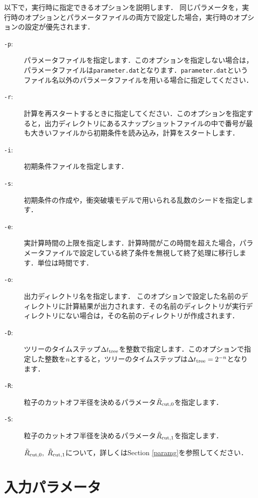 \documentclass[12pt,a4paper,dvipdfmx]{jsarticle}
\begin{document}
以下で，実行時に指定できるオプションを説明します．
同じパラメータを，実行時のオプションとパラメータファイルの両方で設定した場合，実行時のオプションの設定が優先されます．

\begin{description}
\item[\texttt{-p}:]
パラメータファイルを指定します．このオプションを指定しない場合は，パラメータファイルは\texttt{parameter.dat}となります．\texttt{parameter.dat}というファイル名以外のパラメータファイルを用いる場合に指定してください．
\item[\texttt{-r}:]
計算を再スタートするときに指定してください．このオプションを指定すると，出力ディレクトリにあるスナップショットファイルの中で番号が最も大きいファイルから初期条件を読み込み，計算をスタートします．
\item[\texttt{-i}:]
初期条件ファイルを指定します．
\item[\texttt{-s}:]
初期条件の作成や，衝突破壊モデルで用いられる乱数のシードを指定します．
\item[\texttt{-e}:]
実計算時間の上限を指定します．計算時間がこの時間を超えた場合，パラメータファイルで設定している終了条件を無視して終了処理に移行します．単位は時間です．
\item[\texttt{-o}:]
出力ディレクトリ名を指定します．
このオプションで設定した名前のディレクトリに計算結果が出力されます．その名前のディレクトリが実行ディレクトリにない場合は，その名前のディレクトリが作成されます．
\item[\texttt{-D}:]
ツリーのタイムステップ$\Delta t_{\rm tree}$を整数で指定します．このオプションで指定した整数を$n$とすると，ツリーのタイムステップは$\Delta t_{\rm tree}=2^{-n}$となります．
\item[\texttt{-R}:]
粒子のカットオフ半径を決めるパラメータ$\tilde{R}_{\rm cut,0}$を指定します．
\item[\texttt{-S}:]
粒子のカットオフ半径を決めるパラメータ$\tilde{R}_{\rm cut,1}$を指定します．

$\tilde{R}_{\rm cut,0},\ \tilde{R}_{\rm cut,1}$について，詳しくはSection \ref{paramg}を参照してください．

\end{description}

  
\section{入力パラメータ\label{parameter}}
\end{document}
